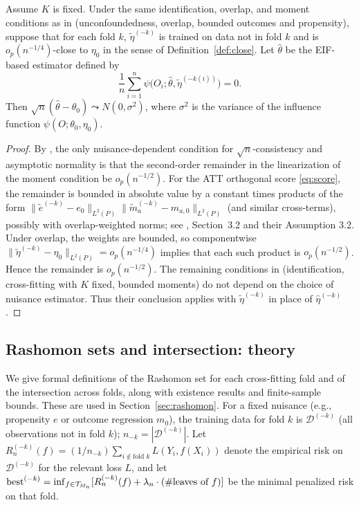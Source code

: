 \documentclass[12pt]{article}
\begin{document}
\begin{theorem}
\label{thm:dml-alt}
Assume $K$ is fixed. Under the same identification, overlap, and moment conditions as in \citet{chernozhukov2018} (unconfoundedness, overlap, bounded outcomes and propensity), suppose that for each fold $k$, $\tilde{\eta}^{(-k)}$ is trained on data not in fold $k$ and is $o_p(n^{-1/4})$-close to $\eta_0$ in the sense of Definition~\ref{def:close}. Let $\hat\theta$ be the EIF-based estimator defined by
\[
\frac{1}{n} \sum_{i=1}^n \psi\bigl(O_i; \hat\theta, \tilde{\eta}^{(-k(i))}\bigr) = 0.
\]
Then $\sqrt{n}(\hat\theta - \theta_0) \leadsto N(0, \sigma^2)$, where $\sigma^2$ is the variance of the influence function $\psi(O; \theta_0, \eta_0)$.
\end{theorem}
\begin{proof}
By \citet{chernozhukov2018}, the only nuisance-dependent condition for $\sqrt{n}$-consistency and asymptotic normality is that the second-order remainder in the linearization of the moment condition be $o_p(n^{-1/2})$. For the ATT orthogonal score \eqref{eq:score}, the remainder is bounded in absolute value by a constant times products of the form $\|\tilde{e}^{(-k)} - e_0\|_{L^2(P)} \|\tilde{m}_a^{(-k)} - m_{a,0}\|_{L^2(P)}$ (and similar cross-terms), possibly with overlap-weighted norms; see \citet{chernozhukov2018}, Section~3.2 and their Assumption 3.2. Under overlap, the weights are bounded, so componentwise $\|\tilde{\eta}^{(-k)} - \eta_0\|_{L^2(P)} = o_p(n^{-1/4})$ implies that each such product is $o_p(n^{-1/2})$. Hence the remainder is $o_p(n^{-1/2})$. The remaining conditions in \citet{chernozhukov2018} (identification, cross-fitting with $K$ fixed, bounded moments) do not depend on the choice of nuisance estimator. Thus their conclusion applies with $\tilde{\eta}^{(-k)}$ in place of $\hat\eta^{(-k)}$.
\end{proof}

\subsection{Rashomon sets and intersection: theory}
\label{app:rashomon}

We give formal definitions of the Rashomon set for each cross-fitting fold and of the intersection across folds, along with existence results and finite-sample bounds. These are used in Section~\ref{sec:rashomon}. For a fixed nuisance (e.g., propensity $e$ or outcome regression $m_0$), the training data for fold $k$ is $\mathcal{D}^{(-k)}$ (all observations not in fold $k$); $n_{-k} = |\mathcal{D}^{(-k)}|$. Let $R_n^{(-k)}(f) = (1/n_{-k}) \sum_{i \notin \text{fold } k} L(Y_i, f(X_i))$ denote the empirical risk on $\mathcal{D}^{(-k)}$ for the relevant loss $L$, and let $\text{best}^{(-k)} = \inf_{f \in \mathcal{T}_{M_n}} [ R_n^{(-k)}(f) + \lambda_n \cdot (\#\text{leaves of } f) ]$ be the minimal penalized risk on that fold.
\end{document}

